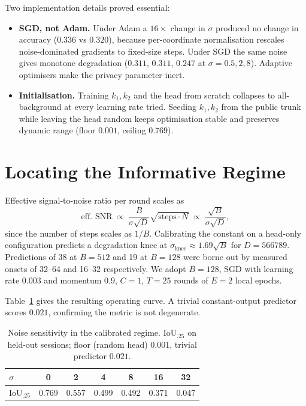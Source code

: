 Two implementation details proved essential:

\begin{itemize}
  \item \textbf{SGD, not Adam.} Under Adam a $16\times$ change in $\sigma$
  produced no change in accuracy ($0.336$ vs $0.320$), because per-coordinate
  normalisation rescales noise-dominated gradients to fixed-size steps. Under SGD
  the same noise gives monotone degradation ($0.311$, $0.311$, $0.247$ at
  $\sigma=0.5,2,8$). Adaptive optimisers make the privacy parameter inert.
  \item \textbf{Initialisation.} Training $k_1,k_2$ and the head from scratch
  collapses to all-background at every learning rate tried. Seeding $k_1,k_2$
  from the public trunk while leaving the head random keeps optimisation stable
  and preserves dynamic range (floor $0.001$, ceiling $0.769$).
\end{itemize}

\section{Locating the Informative Regime}

Effective signal-to-noise ratio per round scales as
\begin{equation}
  \text{eff.\ SNR} \;\propto\; \frac{B}{\sigma\sqrt{D}}\sqrt{\text{steps}\cdot N}
  \;\propto\; \frac{\sqrt{B}}{\sigma\sqrt{D}},
  \label{eq:snr}
\end{equation}
since the number of steps scales as $1/B$. Calibrating the constant on a
head-only configuration predicts a degradation knee at
$\sigma_{\text{knee}}\approx 1.69\sqrt{B}$ for $D=\num{566789}$. Predictions of
\num{38} at $B=512$ and \num{19} at $B=128$ were borne out by measured onsets of
\numrange{32}{64} and \numrange{16}{32} respectively. We adopt $B=128$,
SGD with learning rate \num{0.003} and momentum \num{0.9}, $C=1$, $T=25$ rounds
of $E=2$ local epochs.

Table~\ref{tab:noise} gives the resulting operating curve. A trivial
constant-output predictor scores $0.021$, confirming the metric is not
degenerate.

\begin{table}[t]
\centering
\caption{Noise sensitivity in the calibrated regime. IoU$_{.25}$ on held-out
sessions; floor (random head) $0.001$, trivial predictor $0.021$.}
\label{tab:noise}
\begin{tabular}{lcccccc}
\toprule
$\sigma$ & 0 & 2 & 4 & 8 & 16 & 32 \\
\midrule
IoU$_{.25}$ & 0.769 & 0.557 & 0.499 & 0.492 & 0.371 & 0.047 \\
\bottomrule
\end{tabular}
\end{table}

